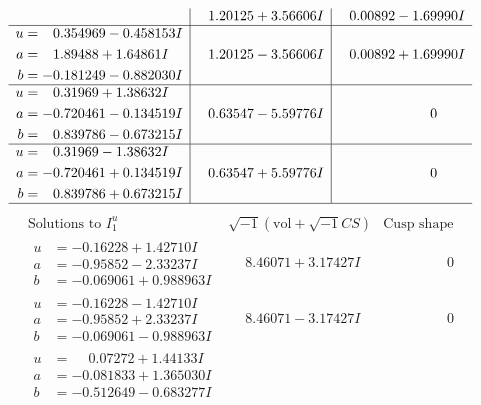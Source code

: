 \documentclass[1p]{elsarticle_modified}
\theoremstyle{definition}
\newcommand{\I}{\sqrt{-1}}
\begin{document}
$$\begin{array}{c|c|c}
 & \phantom{-}1.20125 + 3.56606 I & \phantom{-}0.00892 - 1.69990 I \\ \hline\begin{aligned}
u &= \phantom{-}0.354969 - 0.458153 I \\
a &= \phantom{-}1.89488 + 1.64861 I \\
b &= -0.181249 - 0.882030 I\end{aligned}
 & \phantom{-}1.20125 - 3.56606 I & \phantom{-}0.00892 + 1.69990 I \\ \hline\begin{aligned}
u &= \phantom{-}0.31969 + 1.38632 I \\
a &= -0.720461 - 0.134519 I \\
b &= \phantom{-}0.839786 - 0.673215 I\end{aligned}
 & \phantom{-}0.63547 - 5.59776 I & \phantom{-0.000000 } 0 \\ \hline\begin{aligned}
u &= \phantom{-}0.31969 - 1.38632 I \\
a &= -0.720461 + 0.134519 I \\
b &= \phantom{-}0.839786 + 0.673215 I\end{aligned}
 & \phantom{-}0.63547 + 5.59776 I & \phantom{-0.000000 } 0\\
 \hline 
 \end{array}$$\newpage$$\begin{array}{c|c|c}  
\text{Solutions to }I^u_{1}& \I (\text{vol} + \sqrt{-1}CS) & \text{Cusp shape}\\
 \hline 
\begin{aligned}
u &= -0.16228 + 1.42710 I \\
a &= -0.95852 - 2.33237 I \\
b &= -0.069061 + 0.988963 I\end{aligned}
 & \phantom{-}8.46071 + 3.17427 I & \phantom{-0.000000 } 0 \\ \hline\begin{aligned}
u &= -0.16228 - 1.42710 I \\
a &= -0.95852 + 2.33237 I \\
b &= -0.069061 - 0.988963 I\end{aligned}
 & \phantom{-}8.46071 - 3.17427 I & \phantom{-0.000000 } 0 \\ \hline\begin{aligned}
u &= \phantom{-}0.07272 + 1.44133 I \\
a &= -0.081833 + 1.365030 I \\
b &= -0.512649 - 0.683277 I\end{aligned}

\end{array}$$
\end{document}
